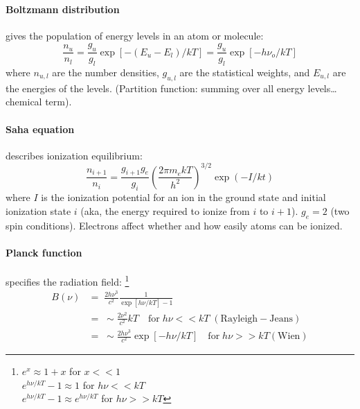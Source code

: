 \documentclass[12pt]{article}
\newcommand{\mar}[1]{\hspace{0pt}\marginpar{-\textcolor{black}{#1}-}}
\begin{document}
\paragraph{Boltzmann distribution}
gives the
\mar{18}
population of energy levels in an atom or molecule:$${
    \frac{n_{u}}{n_{l}} =
    \frac{g_{u}}{g_{l}}\exp\left[-\left(E_{u}-E_{l}\right)/kT\right] =
    \frac{g_{u}}{g_{l}}\exp\left[-h\nu_{o}/kT\right]
}$$
where $n_{u,l}$ are the number densities, $g_{u,l}$ are the
statistical weights, and $E_{u,l}$ are the energies of the levels.
(Partition function: summing over all energy levels\ldots chemical
term).

\paragraph{Saha equation} describes ionization equilibrium:$${
    \frac{n_{i+1}}{n_{i}} = \frac{g_{i+1}g_{e}}{g_{i}}
    \left(\frac{2\pi m_{e}kT}{h^{2}}\right)^{3/2}
    \exp\left(-I/kt\right)
}$$
where $I$ is the ionization potential for an ion in the ground state
and initial ionization state $i$ (aka, the energy required to ionize
from $i$ to $i+1$). $g_{e} = 2$ (two spin conditions). Electrons
affect whether and how easily atoms can be ionized.

\paragraph{Planck function} specifies the radiation field:
\footnote{
    $e^{x} \approx 1+x$ for $x<<1$\\
    $e^{h\nu/kT}-1 \approx 1$ for $h\nu<<kT$\\
    $e^{h\nu/kT}-1 \approx e^{h\nu/kT}$ for $h\nu>>kT$}
\begin{align*}
    B(\nu) &= \;\frac{2h\nu^{3}}{c^{2}}\frac{1}{\exp[h\nu/kT]-1}\\
    &= \;\sim \frac{2\nu^{2}}{c^{2}}kT\quad \mathrm{for}\;h\nu<<kT\;
    (\mathrm{Rayleigh-Jeans})\\
    &= \;\sim \frac{2h\nu^{3}}{c^{2}}\exp[-h\nu/kT]\quad\mathrm{for}\;h\nu>>kT
    (\mathrm{Wien})
\end{align*}
\end{document}

